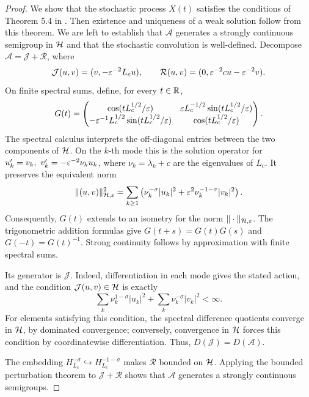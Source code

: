 \begin{proof} 
We show that the stochastic process $X(t)$ satisfies the conditions of Theorem 5.4 in \cite{DaPrato_Zabczyk_2014}. Then existence and uniqueness of a weak solution follow from this theorem. We are left to establish that $\mathcal A$ generates a strongly continuous semigroup in $\mathcal{H}$ and that the stochastic convolution is well-defined.
Decompose \(\mathcal A=\mathcal J+\mathcal R\), where
\[
 \mathcal J(u,v)=(v,-\varepsilon^{-2}L_c u),\qquad
 \mathcal R(u,v)=(0,\varepsilon^{-2}cu-\varepsilon^{-2}v).
\]
On finite spectral sums, define, for every \(t\in\mathbb{R}\),
\begin{equation}\label{eq:abstract_wave_group}
 G(t)=
 \begin{pmatrix}
 \cos(tL_c^{1/2}/\varepsilon)&
       \varepsilon L_c^{-1/2}\sin(tL_c^{1/2}/\varepsilon)\\
 -\varepsilon^{-1}L_c^{1/2}\sin(tL_c^{1/2}/\varepsilon)&
       \cos(tL_c^{1/2}/\varepsilon)
 \end{pmatrix}.
\end{equation}
The spectral calculus interprets the off-diagonal entries between
the two components of \(\mathcal{H}\). On the \(k\)-th mode this is the
solution operator for
\(u_k'=v_k,\ v_k'=-\varepsilon^{-2}\nu_k u_k\), where
\(\nu_k=\lambda_k+c\) are the eigenvalues of $L_c$. It preserves the equivalent norm
\begin{equation}\label{eq:equ_norm}
 \|(u,v)\|_{\mathcal{H},\varepsilon}^2
 =\sum_{k\geq1}\left(\nu_k^{-\sigma}|u_k|^2
             +\varepsilon^2\nu_k^{-1-\sigma}|v_k|^2\right).
\end{equation}
Consequently, \(G(t)\) extends to an isometry for the norm
\(\|\cdot\|_{\mathcal{H},\varepsilon}\).
The trigonometric addition formulas give \(G(t+s)=G(t)G(s)\)
and \(G(-t)=G(t)^{-1}\). Strong continuity follows by approximation
with finite spectral sums.

Its generator is \(\mathcal J\). Indeed, differentiation in each
mode gives the stated action, and the condition
\(\mathcal J(u,v)\in \mathcal{H}\) is exactly
\[
 \sum_k\nu_k^{1-\sigma}|u_k|^2
       +\sum_k\nu_k^{-\sigma}|v_k|^2<\infty.
\]
For elements satisfying this condition, the spectral difference
quotients converge in \(\mathcal{H}\), by dominated convergence; conversely,
convergence in \(\mathcal{H}\) forces this condition by coordinatewise
differentiation. Thus, \(D(\mathcal J)=D(\mathcal A)\).

The embedding \(H_{L_c}^{-\sigma}\hookrightarrow H_{L_c}^{-1-\sigma}\)
makes \(\mathcal R\) bounded on \(\mathcal{H}\). Applying the bounded
perturbation theorem to \(\mathcal J+\mathcal R\) shows that \(\mathcal A\) generates a strongly continuous semigroups.


\end{proof}
